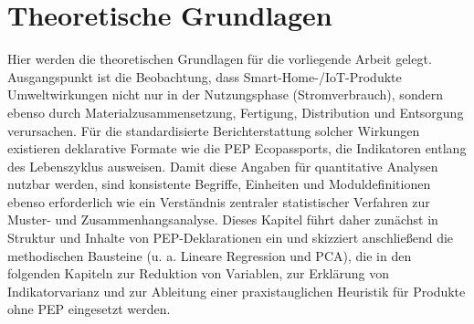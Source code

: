 \chapter{Theoretische Grundlagen}

Hier werden die theoretischen Grundlagen für die vorliegende Arbeit gelegt. 
Ausgangspunkt ist die Beobachtung, dass Smart-Home-/IoT-Produkte Umweltwirkungen nicht nur in der Nutzungsphase (Stromverbrauch), 
sondern ebenso durch Materialzusammensetzung, Fertigung, Distribution und Entsorgung verursachen. 
Für die standardisierte Berichterstattung solcher Wirkungen existieren deklarative Formate wie die PEP Ecopassports, 
die Indikatoren entlang des Lebenszyklus ausweisen. Damit diese Angaben für quantitative Analysen nutzbar werden, 
sind konsistente Begriffe, Einheiten und Moduldefinitionen ebenso erforderlich wie ein Verständnis zentraler 
statistischer Verfahren zur Muster- und Zusammenhangsanalyse. Dieses Kapitel führt daher zunächst in Struktur 
und Inhalte von PEP-Deklarationen ein und skizziert anschließend die methodischen Bausteine 
(u. a. Lineare Regression und PCA), die in den folgenden Kapiteln zur Reduktion von Variablen, 
zur Erklärung von Indikatorvarianz und zur Ableitung einer praxistauglichen Heuristik für Produkte ohne PEP eingesetzt werden.








